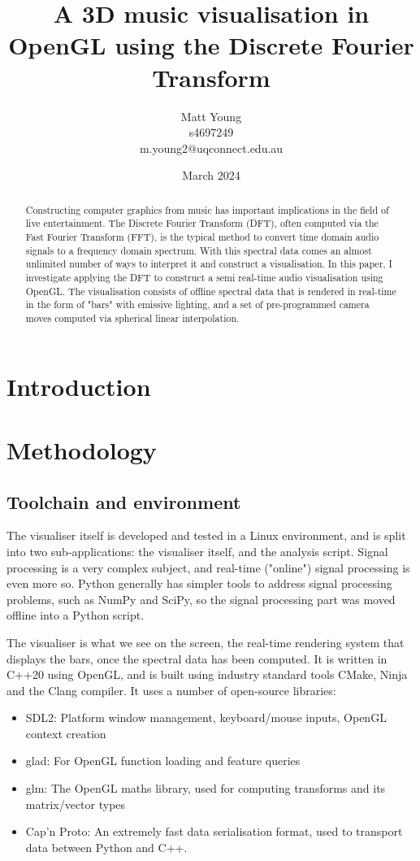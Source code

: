 \documentclass[11pt]{article}
\title{\textbf{A 3D music visualisation in OpenGL using the Discrete Fourier Transform}}
\author{Matt Young \\ s4697249 \\ m.young2@uqconnect.edu.au}
\date{March 2024}
\begin{document}
\maketitle

\begin{abstract}
    Constructing computer graphics from music has important implications in the field of live entertainment.
    The Discrete Fourier Transform (DFT), often computed via the Fast Fourier Transform (FFT), is the typical
    method to convert time domain audio signals to a frequency domain spectrum. With this spectral data comes
    an almost unlimited number of ways to interpret it and construct a visualisation. In this paper, I
    investigate applying the DFT to construct a semi real-time audio visualisation using OpenGL. The
    visualisation consists of offline spectral data that is rendered in real-time in the form of "bars" with
    emissive lighting, and a set of pre-programmed camera moves computed via spherical linear interpolation.
\end{abstract}

\tableofcontents

\section{Introduction}

\section{Methodology}
\subsection{Toolchain and environment}
The visualiser itself is developed and tested in a Linux environment, and is split into two sub-applications:
the visualiser itself, and the analysis script. Signal processing is a very complex subject, and real-time
("online") signal processing is even more so. Python generally has simpler tools to address signal processing
problems, such as NumPy and SciPy, so the signal processing part was moved offline into a Python script.

The visualiser is what we see on the screen, the real-time rendering system that displays the bars, once the
spectral data has been computed. It is written in C++20 using OpenGL, and is built using industry standard
tools CMake, Ninja and the Clang compiler. It uses a number of open-source libraries:
\begin{itemize}
	\item SDL2: Platform window management, keyboard/mouse inputs, OpenGL context creation
	\item glad: For OpenGL function loading and feature queries
    \item glm: The OpenGL maths library, used for computing transforms and its matrix/vector types
    \item Cap'n Proto: An extremely fast data serialisation format, used to transport data between Python and
        C++.
\end{itemize}
\end{document}
